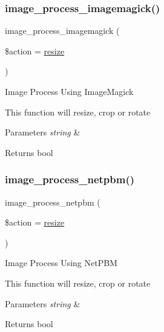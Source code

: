 \subsubsection{\texorpdfstring{image\+\_\+process\+\_\+imagemagick()}{image\_process\_imagemagick()}}
{\footnotesize\ttfamily image\+\_\+process\+\_\+imagemagick (\begin{DoxyParamCaption}\item[{}]{\$action = {\ttfamily \textquotesingle{}\mbox{\hyperlink{class_c_i___image__lib_a94e38a7d478ce07200a52c51497e598e}{resize}}\textquotesingle{}} }\end{DoxyParamCaption})}

Image Process Using Image\+Magick

This function will resize, crop or rotate


\begin{DoxyParams}{Parameters}
{\em string} & \\
\hline
\end{DoxyParams}
\begin{DoxyReturn}{Returns}
bool 
\end{DoxyReturn}
\mbox{\label{class_c_i___image__lib_ab40d1235dccf0611ef4fe5a6b0272dd3}} 
\subsubsection{\texorpdfstring{image\+\_\+process\+\_\+netpbm()}{image\_process\_netpbm()}}
{\footnotesize\ttfamily image\+\_\+process\+\_\+netpbm (\begin{DoxyParamCaption}\item[{}]{\$action = {\ttfamily \textquotesingle{}\mbox{\hyperlink{class_c_i___image__lib_a94e38a7d478ce07200a52c51497e598e}{resize}}\textquotesingle{}} }\end{DoxyParamCaption})}

Image Process Using Net\+P\+BM

This function will resize, crop or rotate


\begin{DoxyParams}{Parameters}
{\em string} & \\
\hline
\end{DoxyParams}
\begin{DoxyReturn}{Returns}
bool 
\end{DoxyReturn}
\mbox{\label{class_c_i___image__lib_a55ee590fb313c50e99d6c1d4cd9618d2}} 
